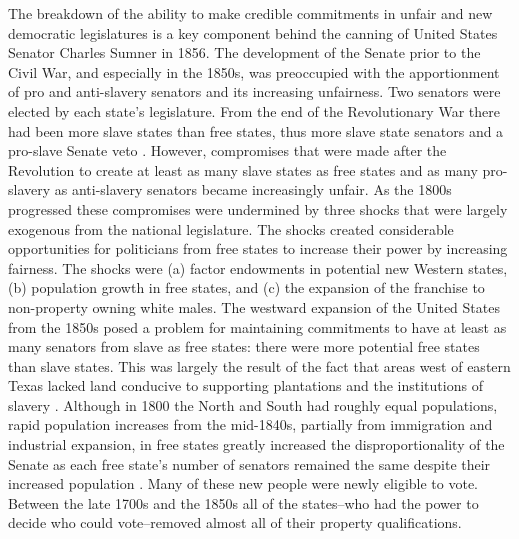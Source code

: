 \documentclass[a4paper]{article}\usepackage[]{graphicx}\usepackage[]{color}
\begin{document}
The breakdown of the ability to make credible commitments in unfair and new democratic legislatures is a key component behind the canning of United States Senator Charles Sumner in 1856. The development of the Senate prior to the Civil War, and especially in the 1850s, was preoccupied with the apportionment of pro and anti-slavery senators and its increasing unfairness. Two senators were elected by each state's legislature. From the end of the Revolutionary War there had been more slave states than free states, thus more slave state senators and a pro-slave Senate veto \cite[see][151]{Weingast1998}. However, compromises that were made after the Revolution to create at least as many slave states as free states and as many pro-slavery as anti-slavery senators became increasingly unfair. As the 1800s progressed these compromises were undermined by three shocks that were largely exogenous from the national legislature. The shocks created considerable opportunities for politicians from free states to increase their power by increasing fairness. The shocks were (a) factor endowments in potential new Western states, (b) population growth in free states, and (c) the expansion of the franchise to non-property owning white males.  The westward expansion of the United States from the 1850s posed a problem for maintaining commitments to have at least as many senators from slave as free states: there were more potential free states than slave states. This was largely the result of the fact that areas west of eastern Texas lacked land conducive to supporting plantations and the institutions of slavery \cite[see][]{Ramsdell1929,Weingast1998,Sokoloff2000}. Although in 1800 the North and South had roughly equal populations, rapid population increases from the mid-1840s, partially from immigration and industrial expansion, in free states greatly increased the disproportionality of the Senate as each free state's number of senators remained the same despite their increased population \cite[see][184]{Weingast1998}. Many of these new people were newly eligible to vote. Between the late 1700s and the 1850s all of the states--who had the power to decide who could vote--removed almost all of their property qualifications.
\end{document}

